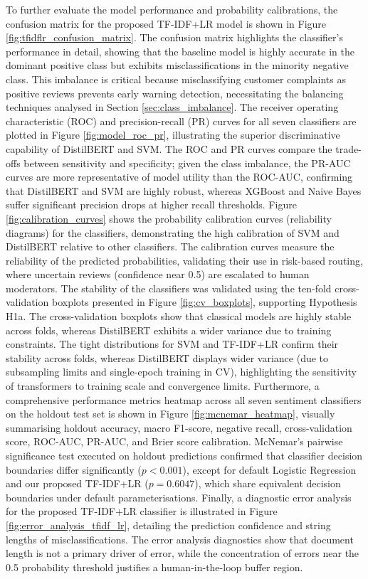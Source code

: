 \documentclass[authoryear,review,3p,times,12pt]{elsarticle}
\begin{document}
To further evaluate the model performance and probability calibrations, the confusion matrix for the proposed TF-IDF+LR model is shown in Figure \ref{fig:tfidflr_confusion_matrix}. The confusion matrix highlights the classifier's performance in detail, showing that the baseline model is highly accurate in the dominant positive class but exhibits misclassifications in the minority negative class. This imbalance is critical because misclassifying customer complaints as positive reviews prevents early warning detection, necessitating the balancing techniques analysed in Section \ref{sec:class_imbalance}. The receiver operating characteristic (ROC) and precision-recall (PR) curves for all seven classifiers are plotted in Figure \ref{fig:model_roc_pr}, illustrating the superior discriminative capability of DistilBERT and SVM. The ROC and PR curves compare the trade-offs between sensitivity and specificity; given the class imbalance, the PR-AUC curves are more representative of model utility than the ROC-AUC, confirming that DistilBERT and SVM are highly robust, whereas XGBoost and Naive Bayes suffer significant precision drops at higher recall thresholds. Figure \ref{fig:calibration_curves} shows the probability calibration curves (reliability diagrams) for the classifiers, demonstrating the high calibration of SVM and DistilBERT relative to other classifiers. The calibration curves measure the reliability of the predicted probabilities, validating their use in risk-based routing, where uncertain reviews (confidence near 0.5) are escalated to human moderators. The stability of the classifiers was validated using the ten-fold cross-validation boxplots presented in Figure \ref{fig:cv_boxplots}, supporting Hypothesis H1a. The cross-validation boxplots show that classical models are highly stable across folds, whereas DistilBERT exhibits a wider variance due to training constraints. The tight distributions for SVM and TF-IDF+LR confirm their stability across folds, whereas DistilBERT displays wider variance (due to subsampling limits and single-epoch training in CV), highlighting the sensitivity of transformers to training scale and convergence limits. Furthermore, a comprehensive performance metrics heatmap across all seven sentiment classifiers on the holdout test set is shown in Figure \ref{fig:mcnemar_heatmap}, visually summarising holdout accuracy, macro F1-score, negative recall, cross-validation score, ROC-AUC, PR-AUC, and Brier score calibration. McNemar's pairwise significance test executed on holdout predictions confirmed that classifier decision boundaries differ significantly ($p < 0.001$), except for default Logistic Regression and our proposed TF-IDF+LR ($p = 0.6047$), which share equivalent decision boundaries under default parameterisations. Finally, a diagnostic error analysis for the proposed TF-IDF+LR classifier is illustrated in Figure \ref{fig:error_analysis_tfidf_lr}, detailing the prediction confidence and string lengths of misclassifications. The error analysis diagnostics show that document length is not a primary driver of error, while the concentration of errors near the 0.5 probability threshold justifies a human-in-the-loop buffer region.
\end{document}
